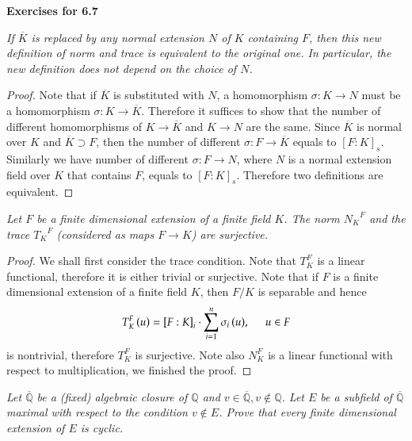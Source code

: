 \begin{center}
\begin{large}
    \textbf{Exercises for 6.7}
\end{large}
\end{center}
\begin{problem}\em
If $\overline{K}$ is replaced by any normal extension $N$ of $K$ containing $F$, then this new definition of norm and trace is equivalent to the original one. In particular, the new definition does not depend on the choice of $N$.
\end{problem}
\begin{proof}
Note that if $\overline{K}$ is substituted with $N$, a homomorphism $\sigma:K\to N$ must be a homomorphism $\sigma:K\to\overline{K}$. Therefore it suffices to show that the number of different homomorphisms of $K\to\overline{K}$ and $K\to N$ are the same. Since $\overline{K}$ is normal over $K$ and $\overline{K}\supset F$, then the number of different $\sigma:F\to\overline{K}$ equals to $[F:K]_s$. Similarly we have number of different $\sigma:F\to N$, where $N$ is a normal extension field over $K$ that contains $F$, equals to $[F:K]_s$. Therefore two definitions are equivalent.
\end{proof}
\begin{problem}\em
Let $F$ be a finite dimensional extension of a finite field $K$. The norm ${N_K}^F$ and the trace ${T_K}^F$ (considered as maps $F\to K$) are surjective.
\end{problem}
\begin{proof}
We shall first consider the trace condition. Note that $T_K^F$ is a linear functional, therefore it is either trivial or surjective. Note that if $F$ is a finite dimensional extension of a finite field $K$, then $F/K$ is separable and hence 
$$
T_{K}^{F}\left( u \right) =\left[ F:K \right] _i\cdot \sum_{i=1}^n{\sigma _i\left( u \right)},\hspace{0.5cm}u\in F
$$
is nontrivial, therefore $T_K^F$ is surjective. Note also $N_K^F$ is a linear functional with respect to multiplication, we finished the proof.
\end{proof}
\begin{problem}\em
Let $\overline{\mathbb{Q}}$ be a (fixed) algebraic closure of $\mathbb{Q}$ and $v\in \overline{\mathbb{Q}}, v\notin \mathbb{Q}$. Let $E$ be a subfield of $\overline{\mathbb{Q}}$ maximal with respect to the condition $v\notin E$. Prove that every finite dimensional extension of $E$ is cyclic.
\end{problem}
